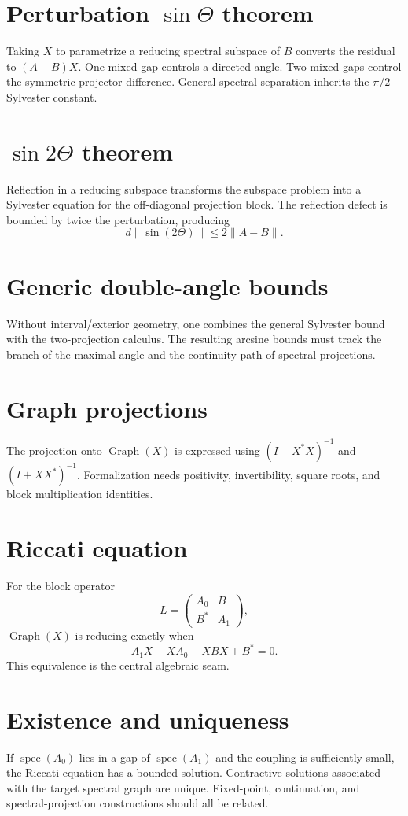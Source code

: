 \documentclass{article}
\newcommand{\spec}{\operatorname{spec}}
\newcommand{\Graph}{\operatorname{Graph}}
\begin{document}
\section{Perturbation $\sin\Theta$ theorem}
Taking $X$ to parametrize a reducing spectral subspace of $B$ converts the
residual to $(A-B)X$.  One mixed gap controls a directed angle.  Two mixed gaps
control the symmetric projector difference.  General spectral separation
inherits the $\pi/2$ Sylvester constant.

\section{$\sin 2\Theta$ theorem}
Reflection in a reducing subspace transforms the subspace problem into a
Sylvester equation for the off-diagonal projection block.  The reflection
defect is bounded by twice the perturbation, producing
\[
 d\|\sin(2\Theta)\|\le2\|A-B\|.
\]

\section{Generic double-angle bounds}
Without interval/exterior geometry, one combines the general Sylvester bound
with the two-projection calculus.  The resulting arcsine bounds must track the
branch of the maximal angle and the continuity path of spectral projections.

\section{Graph projections}
The projection onto $\Graph(X)$ is expressed using
$(I+X^*X)^{-1}$ and $(I+XX^*)^{-1}$.  Formalization needs positivity,
invertibility, square roots, and block multiplication identities.

\section{Riccati equation}
For the block operator
\[
 L=\begin{pmatrix}A_0&B\\B^*&A_1\end{pmatrix},
\]
$\Graph(X)$ is reducing exactly when
\[
 A_1X-XA_0-XBX+B^*=0.
\]
This equivalence is the central algebraic seam.

\section{Existence and uniqueness}
If $\spec(A_0)$ lies in a gap of $\spec(A_1)$ and the coupling is sufficiently
small, the Riccati equation has a bounded solution.  Contractive solutions
associated with the target spectral graph are unique.  Fixed-point,
continuation, and spectral-projection constructions should all be related.
\end{document}
